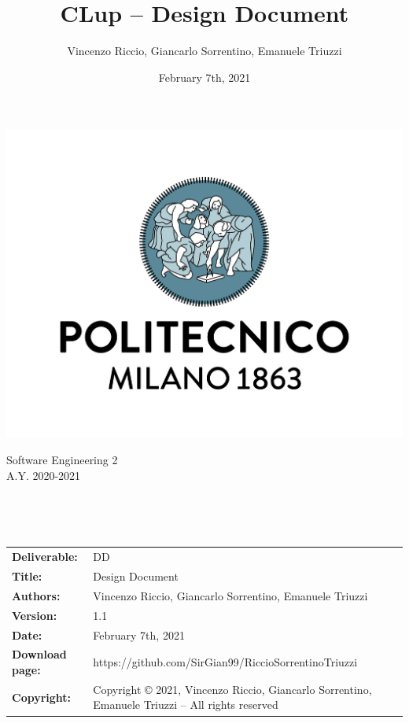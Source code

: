 \documentclass[a4paper,oneside,11pt]{book}
\title{\LARGE{CLup -- Design Document}}
\author{Vincenzo Riccio, Giancarlo Sorrentino, Emanuele Triuzzi}
\date{February 7th, 2021}
\begin{document}
\begin{titlingpage} 
    \begin{center}
        \includegraphics[height=0.52\linewidth]{pictures/polimi}\\ %
        \begin{large}
            Software Engineering 2 \\
            A.Y. 2020-2021\\
        \end{large}
        \vspace{4cm} %
        \begin{large} 
            \textbf{\thetitle} \\
        \end{large}
        \vspace{0.7cm}
        \theauthor\\
        \vspace{7.3cm} %
        \thedate
    \end{center}
\end{titlingpage}

\newpage
\begin{table}[H]
    \begin{tabu} to \textwidth { X[0.3,r,p] X[0.7,l,p] }
        \hline
        \textbf{Deliverable:}   & DD\\
        \textbf{Title:}         & Design Document \\
        \textbf{Authors:}       & Vincenzo Riccio, Giancarlo Sorrentino, \newline Emanuele Triuzzi \\
        \textbf{Version:}       & 1.1 \\ 
        \textbf{Date:}          & February 7th, 2021 \\
        \textbf{Download page:} & https://github.com/SirGian99/RiccioSorrentinoTriuzzi \\
        \textbf{Copyright:}     & Copyright © 2021, Vincenzo Riccio, Giancarlo Sorrentino, Emanuele Triuzzi -- All rights reserved \\
        \hline
    \end{tabu}
\end{table}
\end{document}
